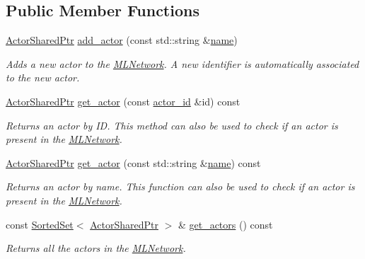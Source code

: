 \subsection*{Public Member Functions}
\begin{DoxyCompactItemize}
\item 
\hyperlink{namespacemlnet_a714fd98ffaeaadd5c38d61fa53dc4d24}{Actor\+Shared\+Ptr} \hyperlink{classmlnet_1_1_m_l_network_aaf56134e14342a301a0d13fcf446b1c4}{add\+\_\+actor} (const std\+::string \&\hyperlink{classmlnet_1_1_m_l_network_aa2e1496321423e15a8e97e0daed30ca7}{name})
\begin{DoxyCompactList}\small\item\em Adds a new actor to the \hyperlink{classmlnet_1_1_m_l_network}{M\+L\+Network}. A new identifier is automatically associated to the new actor. \end{DoxyCompactList}\item 
\hyperlink{namespacemlnet_a714fd98ffaeaadd5c38d61fa53dc4d24}{Actor\+Shared\+Ptr} \hyperlink{classmlnet_1_1_m_l_network_a28d2ad6ba24d565fd4e0fb3ddeb90659}{get\+\_\+actor} (const \hyperlink{namespacemlnet_a1d557bff46b627f1d7f6ff613302bba5}{actor\+\_\+id} \&id) const 
\begin{DoxyCompactList}\small\item\em Returns an actor by I\+D. This method can also be used to check if an actor is present in the \hyperlink{classmlnet_1_1_m_l_network}{M\+L\+Network}. \end{DoxyCompactList}\item 
\hyperlink{namespacemlnet_a714fd98ffaeaadd5c38d61fa53dc4d24}{Actor\+Shared\+Ptr} \hyperlink{classmlnet_1_1_m_l_network_a4031cb1bc3b5de9a204394b38fbfd321}{get\+\_\+actor} (const std\+::string \&\hyperlink{classmlnet_1_1_m_l_network_aa2e1496321423e15a8e97e0daed30ca7}{name}) const 
\begin{DoxyCompactList}\small\item\em Returns an actor by name. This function can also be used to check if an actor is present in the \hyperlink{classmlnet_1_1_m_l_network}{M\+L\+Network}. \end{DoxyCompactList}\item 
const \hyperlink{classmlnet_1_1_sorted_set}{Sorted\+Set}$<$ \hyperlink{namespacemlnet_a714fd98ffaeaadd5c38d61fa53dc4d24}{Actor\+Shared\+Ptr} $>$ \& \hyperlink{classmlnet_1_1_m_l_network_a730f339a39be9b95b1c0ec6e029cabf1}{get\+\_\+actors} () const 
\begin{DoxyCompactList}\small\item\em Returns all the actors in the \hyperlink{classmlnet_1_1_m_l_network}{M\+L\+Network}. \end{DoxyCompactList}\item 

\end{DoxyCompactItemize}
